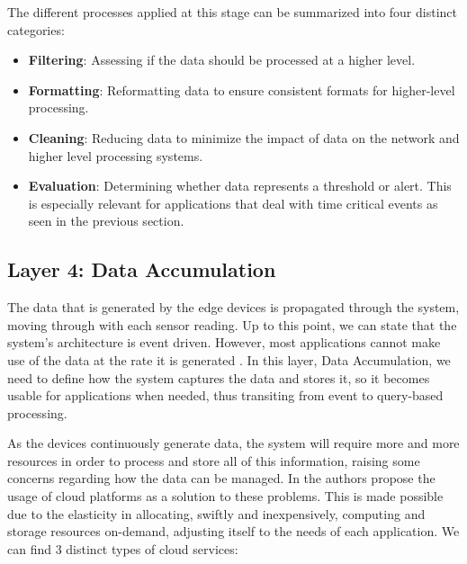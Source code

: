 The different processes applied at this stage can be summarized into four distinct categories:

\begin{itemize}
    \item \textbf{Filtering}: Assessing if the data should be processed at a higher level. 
    \item \textbf{Formatting}: Reformatting data to ensure consistent formats for higher-level processing.
    \item \textbf{Cleaning}: Reducing data to minimize the impact of data on the network and higher level processing systems.
    \item \textbf{Evaluation}: Determining whether data represents a threshold or alert. This is especially relevant for applications that deal with time critical events as seen in the previous section.
\end{itemize}


\subsection{Layer 4: Data Accumulation}
\label{sec:iot-model-layer4}


The data that is generated by the edge devices is propagated through the system, moving through with each sensor reading. Up to this point, we can state that the system's architecture is event driven. However, most applications cannot make use of the data at the rate it is generated \cite{10.5555/3161403}. In this layer, Data Accumulation, we need to define how the system captures the data and stores it, so it becomes usable for applications when needed, thus transiting from event to query-based processing. \bigskip

As the devices continuously generate data, the system will require more and more resources in order to process and store all of this information, raising some concerns regarding how the data can be managed. In \cite{Doukas2012} the authors propose the usage of cloud platforms as a solution to these problems. This is made possible due to the elasticity in allocating, swiftly and inexpensively, computing and storage resources on-demand, adjusting itself to the needs of each application. We can find 3 distinct types of cloud services: %

